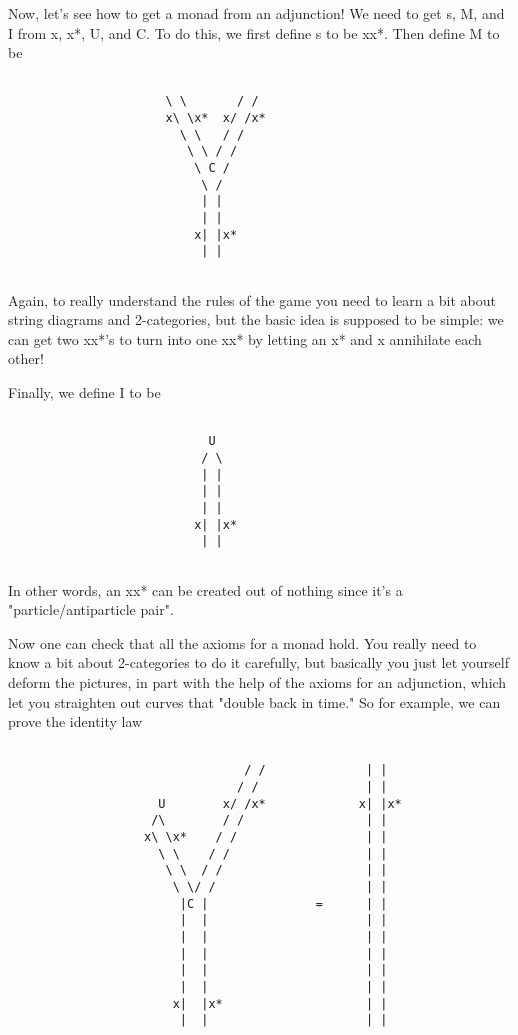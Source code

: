 Now, let's see how to get a monad from an adjunction!  We need to get
s, M, and I from x, x*, U, and C.  To do this, we first define s to be xx*.
Then define M to be

                     

\begin{verbatim}

                      \ \       / /
                      x\ \x*  x/ /x*
                        \ \   / /
                         \ \ / /
                          \ C /
                           \ /
                           | |
                           | |
                          x| |x*
                           | |


\end{verbatim}
    
Again, to really understand the rules of the game you need to learn
a bit about string diagrams and 2-categories, but the basic idea is
supposed to be simple: we can get two xx*'s to turn into one
xx* by letting an x* and x annihilate each other!  

Finally, we define I to be
                     

\begin{verbatim}

                            U
                           / \
                           | |
                           | |
                           | |
                          x| |x*
                           | |


\end{verbatim}
    
In other words, an xx* can be created out of nothing since it's
a "particle/antiparticle pair".  

Now one can check that all the axioms for a monad hold.  You
really need to know a bit about 2-categories to do it carefully,
but basically you just let yourself deform the pictures, in part
with the help of the axioms for an adjunction, which let you
straighten out curves that "double back in time."  So for example, 
we can prove the identity law


\begin{verbatim}

                                 / /              | |
                                / /               | |
                     U        x/ /x*             x| |x*
                    /\        / /                 | |
                   x\ \x*    / /                  | |
                     \ \    / /                   | |
                      \ \  / /                    | |
                       \ \/ /                     | |
                        |C |               =      | |
                        |  |                      | |
                        |  |                      | |
                        |  |                      | |
                        |  |                      | |
                        |  |                      | |
                       x|  |x*                    | |
                        |  |                      | |


\end{verbatim}
    
